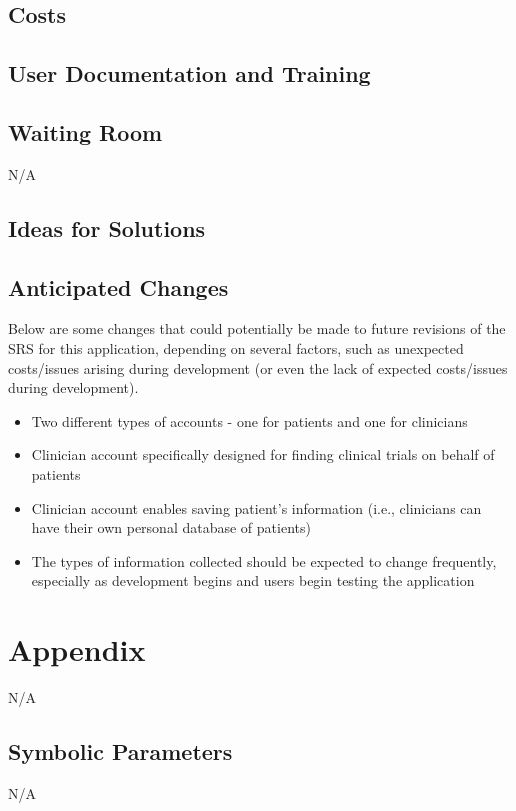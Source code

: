 \documentclass[12pt, titlepage]{article}
\begin{document}
\subsection{Costs}

\subsection{User Documentation and Training}

\subsection{Waiting Room}

N/A

\subsection{Ideas for Solutions}

\subsection{Anticipated Changes}

Below are some changes that could potentially be made to future 
revisions of the SRS for this application, depending on several factors,
such as unexpected costs/issues arising during development (or even the lack 
of expected costs/issues during development).

\begin{itemize}
    \item Two different types of accounts - one for patients and one for clinicians
    \item Clinician account specifically designed for finding clinical trials on behalf of patients
    \item Clinician account enables saving patient's information (i.e., clinicians can have their own personal database of patients)
    \item The types of information collected should be expected to change frequently, especially as development begins and users begin testing the application
\end{itemize}





\newpage

\section{Appendix}

N/A

\subsection{Symbolic Parameters}

N/A
\end{document}
